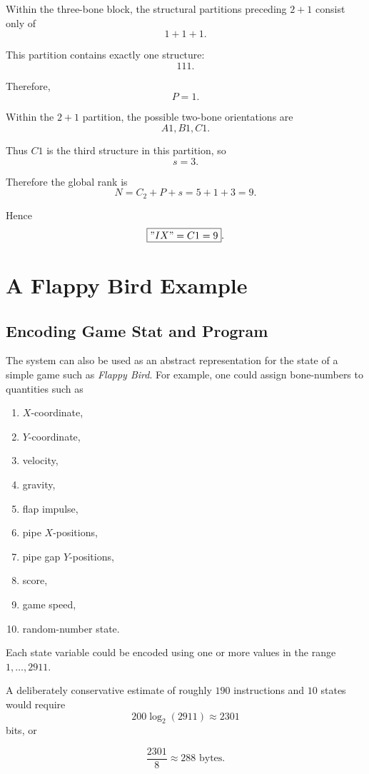 \documentclass[11pt]{article}
\theoremstyle{remark}
\begin{document}
Within the three-bone block, the structural partitions preceding \(2+1\)
consist only of
\[
1+1+1.
\]

This partition contains exactly one structure:
\[
111.
\]

Therefore,
\[
P=1.
\]

Within the \(2+1\) partition, the possible two-bone orientations are
\[
A1,B1,C1.
\]

Thus \(C1\) is the third structure in this partition, so
\[
s=3.
\]

Therefore the global rank is
\[
N=C_2+P+s
=5+1+3
=9.
\]

Hence
\[
\boxed{"IX"=C1=9}.
\]

\section{A Flappy Bird Example}

\subsection{Encoding Game Stat and Program}

The system can also be used as an abstract representation for the state of a
simple game such as \emph{Flappy Bird}. For example, one could assign bone-numbers
to quantities such as

\begin{enumerate}
	\item \(X\)-coordinate,
	\item \(Y\)-coordinate,
	\item velocity,
	\item gravity,
	\item flap impulse,
	\item pipe \(X\)-positions,
	\item pipe gap \(Y\)-positions,
	\item score,
	\item game speed,
	\item random-number state.
\end{enumerate}

Each state variable could be encoded using one or more values in
the range \(1,\ldots,2911\).

\bigskip
A deliberately conservative estimate of roughly \(190\) instructions and \(10\) states would require
\[
200\log_2(2911)
\approx2301
\]
bits, or

\[
\frac{2301}{8}\approx288\text{ bytes}.
\]
\end{document}
